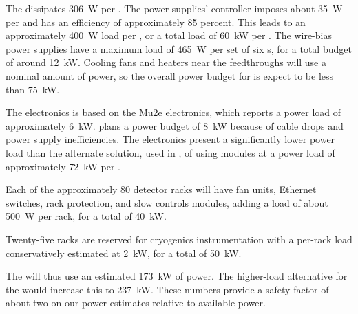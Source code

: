 The  dissipates \SI{306}{W} per .  %
The  power supplies' controller imposes about \SI{35}{W} per  and has an efficiency of approximately 85 percent. This leads to an approximately  \SI{400}{W} load per , or a total load of  \SI{60}{kW} per .  The  wire-bias power supplies have a maximum load of  \SI{465}{W} per set of six s, for a total budget of around  \SI{12}{kW}.   Cooling fans and heaters near the feedthroughs will use a nominal amount of power, so the overall power budget for  %
is expect to be less than \SI{75}{kW}.

The  electronics is based on the Mu2e electronics, which reports a power load of approximately  \SI{6}{kW}.   plans a power budget of  \SI{8}{kW} because of cable drops and  power supply inefficiencies.  The  electronics present a significantly lower power load than the alternate solution, used in , of using  modules at a power load of approximately  \SI{72}{kW} per .

Each of the approximately 80 detector racks will have fan units, Ethernet switches, rack protection, and slow controls modules, adding a load of about \SI{500}{W} per rack, for a total of \SI{40}{kW}.

Twenty-five racks are reserved for cryogenics instrumentation with a per-rack load conservatively estimated at \SI{2}{kW}, for a total of \SI{50}{kW}. 

The  will thus use  an estimated \SI{173}{kW} of power. The higher-load  alternative for the  would increase this to \SI{237}{kW}.  These numbers provide a safety factor of about two on our power estimates relative to available power.


